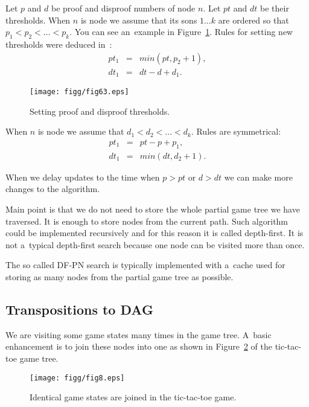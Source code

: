 Let $p$ and $d$ be proof and disproof numbers of node $n$. Let $pt$ and $dt$ be
their thresholds. When $n$ is  node we assume that its sons $1\ldots k$
are ordered so that $p_1 < p_2 < \ldots < p_k$. You can see an~example in
Figure~\ref{sesttri}. Rules for setting new thresholds were deduced in~\cite{epsilon}:
\begin{eqnarray*} 
	pt_1 &=& min(pt, p_2+1), \\
	dt_1 &=& dt - d + d_1.
\end{eqnarray*}

\begin{figure}
	\centerline{\mbox{\texttt{[image: figg/fig63.eps]}}}
	\caption{Setting proof and disproof thresholds.}
	\label{sesttri}
\end{figure}

When $n$ is  node we assume that $d_1 < d_2 < \ldots < d_k$. Rules
are symmetrical:  
\begin{eqnarray*} 
	pt_1 &=& pt-p+p_1, \\
	dt_1 &=& min(dt,d_2+1).
\end{eqnarray*}

When we delay updates to the time when $p > pt$ or $d > dt$ we can make
more changes to the algorithm. 

Main point is that we do not need to store the whole partial game tree we have traversed. It is
enough to store nodes from the current path. Such algorithm could be implemented
recursively and for this reason it is called depth-first.
It is not a~typical depth-first search because one node can be visited more
than once. 

The so called DF-PN search is typically implemented with a~cache used for storing as many
nodes from the partial game tree as possible. 

\subsection{Transpositions to DAG} \label{DAG}
 
We are visiting some game states many times in the game tree. A~basic
enhancement is to join these nodes into one as shown in Figure~\ref{osm}
of the tic-tac-toe game tree.

\begin{figure}
	\centerline{\mbox{\texttt{[image: figg/fig8.eps]}}}
	\caption{Identical game states are joined in the tic-tac-toe game.}
	\label{osm}
\end{figure}

